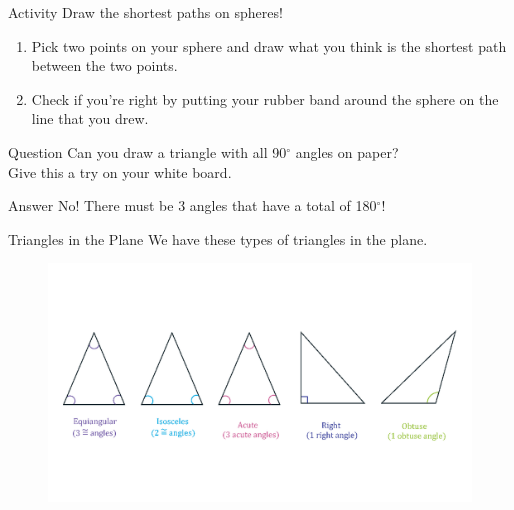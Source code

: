 \documentclass[UKenglish]{beamer}
\begin{document}
\begin{frame}{Activity}
    Draw the shortest paths on spheres!\\
    
    \begin{enumerate}[1.]
        \item Pick two points on your sphere and draw what you think is the shortest path between the two points.
        \item Check if you're right by putting your rubber band around the sphere on the line that you drew.
    \end{enumerate}
    
    
    
\end{frame}






\begin{frame}{Question}
    Can you draw a triangle with all 90$^\circ$ angles on paper?\\
    \pause
    Give this a try on your white board.
\end{frame}

\begin{frame}{Answer}
    No! 
    \pause
    There must be 3 angles that have a total of 180$^\circ$!
\end{frame}

\begin{frame}{Triangles in the Plane}
    We have these types of triangles in the plane.
    \begin{figure}
        \centering
        \includegraphics[width=.7\textwidth]{Figures/triangle-classification-angles.png}
    \end{figure}
\end{frame}
\end{document}
